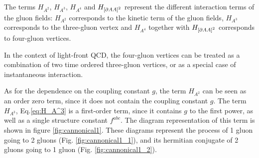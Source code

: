 \documentclass[11pt,a4paper,twoside,pdf]{article}
\numberwithin{equation}{section}
\begin{document}
The terms $H_{A^2}$, $H_{A^3}$, $H_{A^4}$ and $H_{\left[ \partial A A \right]^2}$
represent the different interaction terms of the gluon fields: $H_{A^2}$ corresponds to 
the kinetic term of the gluon fields, $H_{A^3}$ corresponds to the three-gluon
vertex and  $H_{A^4}$ together with $H_{\left[ \partial A A \right]^2}$ corresponds to
four-gluon vertices. 

In the context of light-front QCD, the four-gluon vertices can be treated as a combination of two
time ordered
three-gluon vertices,  or as a
special case of instantaneous interaction.

As for the dependence on the coupling constant \( g \), the term $H_{A^2}$ can be seen 
as an order zero term, since it does not contain the coupling constant \( g \).
The term $H_{A^3}$, Eq.\eqref{eq:H_A^3} is a first-order term, since it contains $g$ to the first power,
as well as a single structure constant $f^{abc}$. The diagram representation of this term 
is shown in figure \ref{fig:cannonical1}. These diagrams represent the 
process of 1 gluon going to 2 gluons (Fig. \ref{fig:cannonical1_1}), and 
its hermitian conjugate of 2 gluons going to 1 gluon (Fig. \ref{fig:cannonical1_2}).
\end{document}
